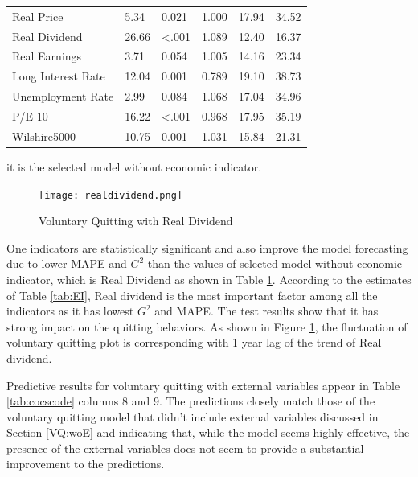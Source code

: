 \begin{table}[h!]
\begin{threeparttable}
\begin{tabular}{@{}llllll@{}}
			Real Price                & 5.34       & 0.021          & 1.000        & 17.94 & 34.52 \\
			Real Dividend             & 26.66      & \textless.001  & 1.089        & 12.40 & 16.37 \\
			Real Earnings             & 3.71       & 0.054          & 1.005        & 14.16 & 23.34 \\
			Long Interest Rate        & 12.04      & 0.001          & 0.789        & 19.10 & 38.73 \\
			Unemployment Rate         & 2.99       & 0.084          & 1.068        & 17.04 & 34.96 \\
			P/E 10                     & 16.22      & \textless.001  & 0.968        & 17.95 & 35.19 \\
			Wilshire5000              & 10.75      & 0.001          & 1.031        & 15.84 & 21.31 \\ \bottomrule
		\end{tabular}
		\begin{tablenotes}
			\item[1] it is the selected model without economic indicator.
		\end{tablenotes}
	\end{threeparttable}
	\label{tab:vqEI}%
\end{table}

\begin{figure}
	\centering
	\texttt{[image: realdividend.png]}
	\caption{Voluntary Quitting with Real Dividend}
	\label{fig:vqrealdividend}
\end{figure}
One indicators are statistically significant and also improve the model forecasting due to lower MAPE and $G^2$ than the values of selected model without economic indicator, which is Real Dividend as shown in Table \ref{tab:vqEI}. According to the estimates of Table \ref{tab:EI}, Real dividend is the most important factor among all the indicators as it has lowest $G^2$ and MAPE. The test results show that it has strong impact on the quitting behaviors. As shown in Figure \ref{fig:vqrealdividend}, the fluctuation of voluntary quitting plot is corresponding with 1 year lag of the trend of Real dividend.


Predictive results for voluntary quitting with external variables appear in Table \ref{tab:cocscode} columns 8 and 9.  The predictions closely match those of the voluntary quitting model that didn't include external variables discussed in Section \ref{VQ:woE} and indicating that, while the model seems highly effective, the presence of the external variables does not seem to provide a substantial improvement to the predictions.

